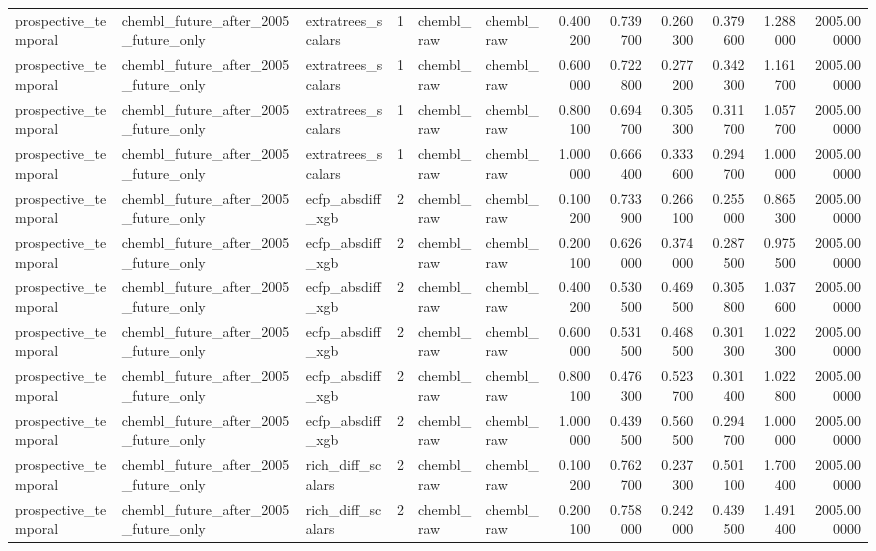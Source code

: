 \begin{longtable}{lllrllrrrrrr}
prospective\_temporal & chembl\_future\_after\_2005\_future\_only & extratrees\_scalars & 1 & chembl\_raw & chembl\_raw & 0.400200 & 0.739700 & 0.260300 & 0.379600 & 1.288000 & 2005.000000 \\
prospective\_temporal & chembl\_future\_after\_2005\_future\_only & extratrees\_scalars & 1 & chembl\_raw & chembl\_raw & 0.600000 & 0.722800 & 0.277200 & 0.342300 & 1.161700 & 2005.000000 \\
prospective\_temporal & chembl\_future\_after\_2005\_future\_only & extratrees\_scalars & 1 & chembl\_raw & chembl\_raw & 0.800100 & 0.694700 & 0.305300 & 0.311700 & 1.057700 & 2005.000000 \\
prospective\_temporal & chembl\_future\_after\_2005\_future\_only & extratrees\_scalars & 1 & chembl\_raw & chembl\_raw & 1.000000 & 0.666400 & 0.333600 & 0.294700 & 1.000000 & 2005.000000 \\
prospective\_temporal & chembl\_future\_after\_2005\_future\_only & ecfp\_absdiff\_xgb & 2 & chembl\_raw & chembl\_raw & 0.100200 & 0.733900 & 0.266100 & 0.255000 & 0.865300 & 2005.000000 \\
prospective\_temporal & chembl\_future\_after\_2005\_future\_only & ecfp\_absdiff\_xgb & 2 & chembl\_raw & chembl\_raw & 0.200100 & 0.626000 & 0.374000 & 0.287500 & 0.975500 & 2005.000000 \\
prospective\_temporal & chembl\_future\_after\_2005\_future\_only & ecfp\_absdiff\_xgb & 2 & chembl\_raw & chembl\_raw & 0.400200 & 0.530500 & 0.469500 & 0.305800 & 1.037600 & 2005.000000 \\
prospective\_temporal & chembl\_future\_after\_2005\_future\_only & ecfp\_absdiff\_xgb & 2 & chembl\_raw & chembl\_raw & 0.600000 & 0.531500 & 0.468500 & 0.301300 & 1.022300 & 2005.000000 \\
prospective\_temporal & chembl\_future\_after\_2005\_future\_only & ecfp\_absdiff\_xgb & 2 & chembl\_raw & chembl\_raw & 0.800100 & 0.476300 & 0.523700 & 0.301400 & 1.022800 & 2005.000000 \\
prospective\_temporal & chembl\_future\_after\_2005\_future\_only & ecfp\_absdiff\_xgb & 2 & chembl\_raw & chembl\_raw & 1.000000 & 0.439500 & 0.560500 & 0.294700 & 1.000000 & 2005.000000 \\
prospective\_temporal & chembl\_future\_after\_2005\_future\_only & rich\_diff\_scalars & 2 & chembl\_raw & chembl\_raw & 0.100200 & 0.762700 & 0.237300 & 0.501100 & 1.700400 & 2005.000000 \\
prospective\_temporal & chembl\_future\_after\_2005\_future\_only & rich\_diff\_scalars & 2 & chembl\_raw & chembl\_raw & 0.200100 & 0.758000 & 0.242000 & 0.439500 & 1.491400 & 2005.000000 \\

\end{longtable}
